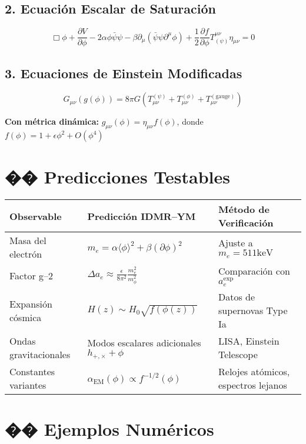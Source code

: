 \documentclass[12pt]{article}
\begin{document}
\subsection*{2. Ecuación Escalar de Saturación}


\[
\Box\phi + \frac{\partial V}{\partial\phi} - 2\alpha\phi\bar{\psi}\psi - \beta\partial_\mu(\bar{\psi}\psi\partial^\mu\phi) + \frac{1}{2}\frac{\partial f}{\partial\phi}T^{\mu\nu}_{(\psi)}\eta_{\mu\nu} = 0
\]



\subsection*{3. Ecuaciones de Einstein Modificadas}


\[
G_{\mu\nu}(g(\phi)) = 8\pi G\left(T^{(\psi)}_{\mu\nu} + T^{(\phi)}_{\mu\nu} + T^{(\text{gauge})}_{\mu\nu}\right)
\]


\textbf{Con métrica dinámica:} \( g_{\mu\nu}(\phi) = \eta_{\mu\nu}f(\phi) \), donde \( f(\phi) = 1 + \epsilon\phi^2 + O(\phi^4) \)

\section*{�� Predicciones Testables}
\begin{center}
\begin{tabular}{|l|l|l|}
\hline
\textbf{Observable} & \textbf{Predicción IDMR--YM} & \textbf{Método de Verificación} \\
\hline
Masa del electrón & \( m_e = \alpha\langle\phi\rangle^2 + \beta(\partial\phi)^2 \) & Ajuste a \( m_e = 511 \text{keV} \) \\
Factor g--2 & \( \Delta a_e \approx \frac{\epsilon}{8\pi^2}\frac{m_e^2}{m_\phi^2} \) & Comparación con \( a_e^{\text{exp}} \) \\
Expansión cósmica & \( H(z) \sim H_0\sqrt{f(\phi(z))} \) & Datos de supernovas Type Ia \\
Ondas gravitacionales & Modos escalares adicionales \( h_{+,\times} + \phi \) & LISA, Einstein Telescope \\
Constantes variantes & \( \alpha_{\text{EM}}(\phi) \propto f^{-1/2}(\phi) \) & Relojes atómicos, espectros lejanos \\
\hline
\end{tabular}
\end{center}

\section*{�� Ejemplos Numéricos}
\end{document}

